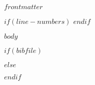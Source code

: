 \documentclass[$if(elsarticle)$$elsarticle$$endif$]{elsarticle}
\begin{document}
\begin{frontmatter}

$frontmatter$

\end{frontmatter}

$if(line-numbers)$
\linenumbers
$endif$

$body$

$if(bibfile)$

$else$

$endif$
\end{document}
